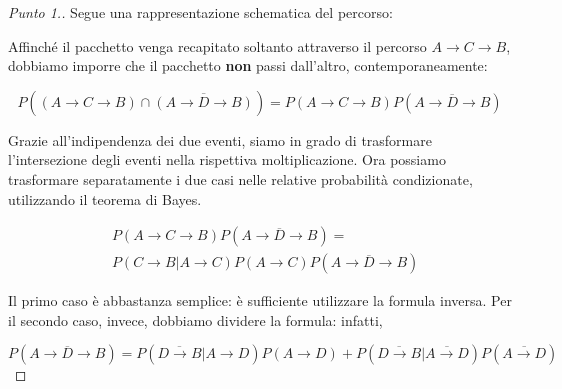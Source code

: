 \documentclass[12pt]{article}
\renewcommand\qedsymbol{$\square$}
\begin{document}
\renewcommand\qedsymbol{$\square$}

\begin{proof}[Punto 1.]
	Segue una rappresentazione schematica del percorso:

	\begin{center}
	\end{center}

	Affinché il pacchetto venga recapitato soltanto attraverso il percorso $A \rightarrow C \rightarrow B$, dobbiamo imporre che il pacchetto \textbf{non} passi dall'altro, contemporaneamente:

	\[
		P((A \rightarrow C \rightarrow B) \cap \overline{(A \rightarrow D \rightarrow B)}) = P(A \rightarrow C \rightarrow B)P(\overline{A \rightarrow D \rightarrow B})
	\]

	Grazie all'indipendenza dei due eventi, siamo in grado di trasformare l'intersezione degli eventi nella rispettiva moltiplicazione. Ora possiamo trasformare separatamente i due casi nelle relative probabilità condizionate, utilizzando il teorema di Bayes.

	\begin{equation*}
		\begin{split}
			&P(A \rightarrow C \rightarrow B) P(\overline{A \rightarrow D \rightarrow B}) = \\
			&P(C \rightarrow B|A \rightarrow C)P(A \rightarrow C) P(\overline{A \rightarrow D \rightarrow B})
		\end{split}
	\end{equation*}

	Il primo caso è abbastanza semplice: è sufficiente utilizzare la formula inversa. Per il secondo caso, invece, dobbiamo dividere la formula: infatti,

	\[
		P(\overline{A \rightarrow D \rightarrow B}) = P(\overline{D \rightarrow B}|A \rightarrow D)P(A \rightarrow D) + P(\overline{D \rightarrow B}|\overline{A \rightarrow D})P(\overline{A \rightarrow D})
	\]


\end{proof}
\end{document}
